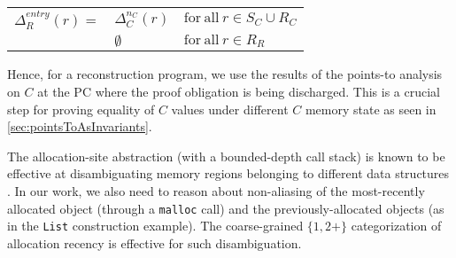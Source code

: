 \begin{center}
\begin{tabular}{rll}
$\Delta^{entry}_R(r)=$ & $\Delta^{n_C}_C(r)$ & $\mathrm{for\ all}\ r \in{}S_C\cup{}R_C$ \\
& $\emptyset$ & $\mathrm{for\ all}\ r \in{}R_R$ \\
\end{tabular}
\end{center}

Hence, for a reconstruction program, we use the results of the points-to analysis on $C$ at the PC where
the proof obligation is being discharged. This is a crucial step for proving equality of $C$ values
under different $C$ memory state as seen in \cref{sec:pointsToAsInvariants}.

The allocation-site abstraction (with a bounded-depth call stack) is
known to be effective at disambiguating memory regions belonging to
different data structures
\cite{allocationSiteAbstraction82,allocationSiteAbstraction90,allocationSiteAbstraction06}.
In our work, we also need to reason about non-aliasing
of the most-recently allocated object (through a {\tt malloc} call) and
the previously-allocated objects (as in the {\tt List}
construction example). The coarse-grained $\{1, 2+\}$
categorization of allocation recency is effective for such
disambiguation.